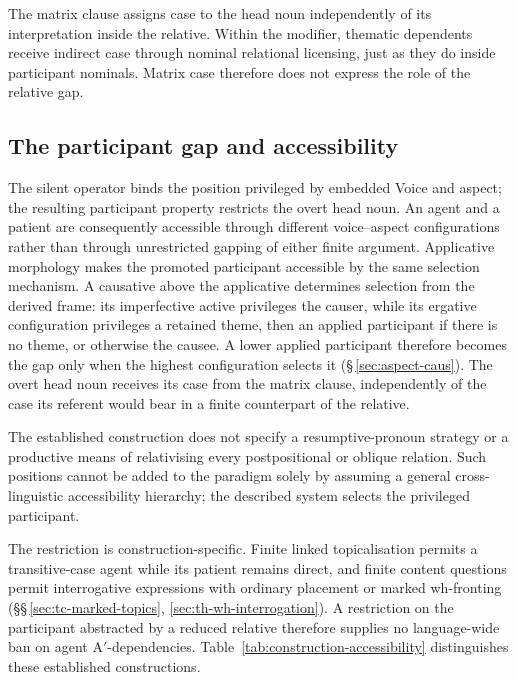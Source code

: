The matrix clause assigns case to the head noun independently of its
interpretation inside the relative. Within the modifier, thematic dependents
receive indirect case through nominal relational licensing, just as they do
inside participant nominals. Matrix case therefore does not express the role
of the relative gap.

\subsection{The participant gap and accessibility}
\label{sec:th-rel-gap}

The silent operator binds the position privileged by embedded Voice and aspect;
the resulting participant property restricts the overt head noun. An agent
and a patient are consequently accessible through different voice--aspect
configurations rather than through unrestricted gapping of either finite
argument. Applicative morphology makes the promoted participant accessible by
the same selection mechanism. A causative above the applicative determines
selection from the derived frame: its imperfective active privileges the
causer, while its ergative configuration privileges a retained theme, then an
applied participant if there is no theme, or otherwise the causee. A lower
applied participant therefore becomes the gap only when the highest
configuration selects it (§\,\ref{sec:aspect-caus}). The overt head noun
receives its case from the matrix clause, independently of the case its
referent would bear in a finite counterpart of the relative.

The established construction does not specify a resumptive-pronoun strategy
or a productive means of relativising every postpositional or oblique relation.
Such positions cannot be added to the paradigm solely by assuming a general
cross-linguistic accessibility hierarchy; the described  system
selects the privileged participant.

The restriction is construction-specific. Finite linked topicalisation
 permits a transitive-case agent while its patient remains direct, and finite
 content questions permit interrogative expressions with ordinary placement
 or marked wh-fronting
 (§§\,\ref{sec:tc-marked-topics}, \ref{sec:th-wh-interrogation}). A restriction
 on the participant abstracted by a reduced relative therefore supplies no
 language-wide ban on agent A$'$-dependencies. Table~\ref{tab:construction-accessibility}
 distinguishes these established constructions.

